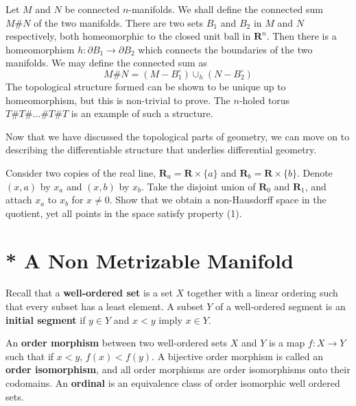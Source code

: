 \begin{example}
    Let $M$ and $N$ be connected $n$-manifolds. We shall define the connected sum $M \# N$ of the two manifolds. There are two sets $B_1$ and $B_2$ in $M$ and $N$ respectively, both homeomorphic to the closed unit ball in $\mathbf{R}^n$. Then there is a homeomorphism $h:\partial B_1 \to \partial B_2$ which connects the boundaries of the two manifolds. We may define the connected sum as
    \[ M \# N = (M - B_1^\circ) \cup_h (N - B_2^\circ) \]
    The topological structure formed can be shown to be unique up to homeomorphism, but this is non-trivial to prove. The $n$-holed torus $T \# T \# \dots \# T \# T$ is an example of such a structure.
\end{example}

Now that we have discussed the topological parts of geometry, we can move on to describing the differentiable structure that underlies differential geometry.

\begin{exercise} Consider two copies of the real line, $\mathbf{R}_a = \mathbf{R} \times \{a\}$ and $\mathbf{R}_b = \mathbf{R} \times \{b\}$. Denote $(x,a)$ by $x_a$ and $(x, b)$ by $x_b$. Take the disjoint union of $\mathbf{R}_0$ and $\mathbf{R}_1$, and attach $x_a$ to $x_b$ for $x \neq 0$. Show that we obtain a non-Hausdorff space in the quotient, yet all points in the space satisfy property (1).
\end{exercise}

\newpage

\section{* A Non Metrizable Manifold}

Recall that a {\bf well-ordered set} is a set $X$ together with a linear ordering such that every subset has a least element. A subset $Y$ of a well-ordered segment is an {\bf initial segment} if $y \in Y$ and $x < y$ imply $x \in Y$.

\begin{definition}
    An {\bf order morphism} between two well-ordered sets $X$ and $Y$ is a map $f:X \to Y$ such that if $x < y$, $f(x) < f(y)$. A bijective order morphism is called an {\bf order isomorphism}, and all order morphisms are order isomorphisms onto their codomains. An {\bf ordinal} is an equivalence class of order isomorphic well ordered sets.
\end{definition}

